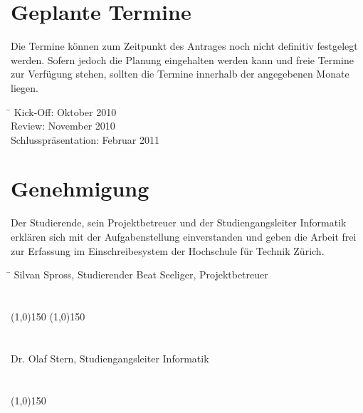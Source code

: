 \documentclass[]{scrreprt}
\begin{document}
    \section{Geplante Termine}
    Die Termine können zum Zeitpunkt des Antrages noch nicht definitiv 
    festgelegt werden. Sofern jedoch die Planung eingehalten werden kann und 
    freie Termine zur Verfügung stehen, sollten die Termine innerhalb der 
    angegebenen Monate liegen.

    \begin{tabbing}
        \hspace*{4cm}\= \kill
    	Kick-Off:               \> Oktober 2010 \\
    	Review:                 \> November 2010 \\
    	Schlusspräsentation:    \> Februar 2011 \\
    \end{tabbing}

    \section{Genehmigung}
    Der Studierende, sein Projektbetreuer und der Studiengangsleiter 
    Informatik erklären sich mit der Aufgabenstellung einverstanden und geben 
    die Arbeit frei zur Erfassung im Einschreibesystem der Hochschule für 
    Technik Zürich.

    \begin{tabbing}
        \hspace*{10cm}\= \kill
    	Silvan Spross, Studierender \> Beat Seeliger, Projektbetreuer \\\\\\
        \line(1,0){150} \> \line(1,0){150} \\\\\\
    	Dr. Olaf Stern, Studiengangsleiter Informatik \\\\\\
        \line(1,0){150}
    \end{tabbing}
    
    
    
    
\end{document}
